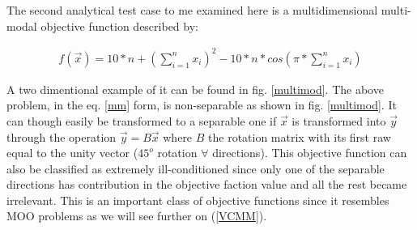 \newpage
The second analytical test case to me examined here is a multidimensional multi-modal objective function described by:  

\begin{eqnarray}
   f(\vec{x})=10*n+(\sum^{n}_{i=1}x_i)^2 - 10*n*cos(\pi * \sum^{n}_{i=1}x_i)
   \label{mm} 
\end{eqnarray}

A two dimentional example of it can be found in fig. \ref{multimod}. The above problem, in the eq. \ref{mm} form, is non-separable as shown in fig. \ref{multimod}. It can though easily be transformed to a separable one if $\vec{x}$ is transformed into $\vec{y}$ through the operation $\vec{y}=B\vec{x}$ where $B$ the rotation matrix with its first raw equal to the unity vector ($45^o$ rotation $\forall$ directions).  This objective function can also be classified as extremely ill-conditioned since only one of the separable directions has contribution in the objective faction value and all the rest became irrelevant. This is an important class of objective functions since it resembles MOO problems as we will see further on (\ref{VCMM}).    

